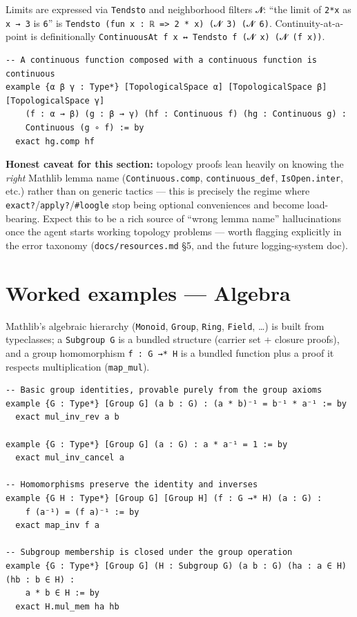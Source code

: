 Limits are expressed via \texttt{Tendsto} and neighborhood filters \texttt{𝓝}: ``the limit of \texttt{2*x} as \texttt{x → 3} is \texttt{6}'' is \texttt{Tendsto (fun x : ℝ => 2 * x) (𝓝 3) (𝓝 6)}. Continuity-at-a-point is definitionally \texttt{ContinuousAt f x ↔ Tendsto f (𝓝 x) (𝓝 (f x))}.

\begin{verbatim}
-- A continuous function composed with a continuous function is continuous
example {α β γ : Type*} [TopologicalSpace α] [TopologicalSpace β] [TopologicalSpace γ]
    (f : α → β) (g : β → γ) (hf : Continuous f) (hg : Continuous g) :
    Continuous (g ∘ f) := by
  exact hg.comp hf
\end{verbatim}

\textbf{Honest caveat for this section:} topology proofs lean heavily on knowing the \emph{right} Mathlib lemma name (\texttt{Continuous.comp}, \texttt{continuous\_def}, \texttt{IsOpen.inter}, etc.) rather than on generic tactics --- this is precisely the regime where \texttt{exact?}/\texttt{apply?}/\texttt{\#loogle} stop being optional conveniences and become load-bearing. Expect this to be a rich source of ``wrong lemma name'' hallucinations once the agent starts working topology problems --- worth flagging explicitly in the error taxonomy (\texttt{docs/resources.md} \S5, and the future logging-system doc).

\section{Worked examples --- Algebra}

Mathlib's algebraic hierarchy (\texttt{Monoid}, \texttt{Group}, \texttt{Ring}, \texttt{Field}, \ldots) is built from typeclasses; a \texttt{Subgroup G} is a bundled structure (carrier set + closure proofs), and a group homomorphism \texttt{f : G →* H} is a bundled function plus a proof it respects multiplication (\texttt{map\_mul}).

\begin{verbatim}
-- Basic group identities, provable purely from the group axioms
example {G : Type*} [Group G] (a b : G) : (a * b)⁻¹ = b⁻¹ * a⁻¹ := by
  exact mul_inv_rev a b

example {G : Type*} [Group G] (a : G) : a * a⁻¹ = 1 := by
  exact mul_inv_cancel a

-- Homomorphisms preserve the identity and inverses
example {G H : Type*} [Group G] [Group H] (f : G →* H) (a : G) :
    f (a⁻¹) = (f a)⁻¹ := by
  exact map_inv f a

-- Subgroup membership is closed under the group operation
example {G : Type*} [Group G] (H : Subgroup G) (a b : G) (ha : a ∈ H) (hb : b ∈ H) :
    a * b ∈ H := by
  exact H.mul_mem ha hb
\end{verbatim}

